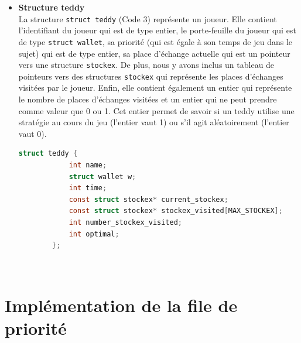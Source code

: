 \documentclass[12pt]{article}
\begin{document}
\begin{itemize}
        
        \item \textbf{Structure teddy}\\
        
        La structure \texttt{struct teddy} (Code 3) représente un joueur. Elle contient l'identifiant du joueur qui est de type entier, le porte-feuille du joueur qui est de type \texttt{struct wallet}, sa priorité (qui est égale à son temps de jeu dans le sujet) qui est de type entier, sa place d'échange actuelle qui est un pointeur vers une structure \texttt{stockex}. De plus, nous y avons inclus un tableau de pointeurs vers des structures \texttt{stockex} qui représente les places d'échanges visitées par le joueur. Enfin, elle contient également un entier qui représente le nombre de places d'échanges visitées et un entier qui ne peut prendre comme valeur que 0 ou 1. Cet entier permet de savoir si un teddy utilise une stratégie au cours du jeu (l'entier vaut 1) ou s'il agit aléatoirement (l'entier vaut 0).
        \begin{lstlisting}[language=C, caption=Structure \texttt{teddy}]
         struct teddy {
            int name;
            struct wallet w;
            int time;
            const struct stockex* current_stockex;
            const struct stockex* stockex_visited[MAX_STOCKEX];
            int number_stockex_visited;
            int optimal;
        };\end{lstlisting}
        \end{itemize}\\
        
        \section{Implémentation de la file de priorité}
\end{document}
